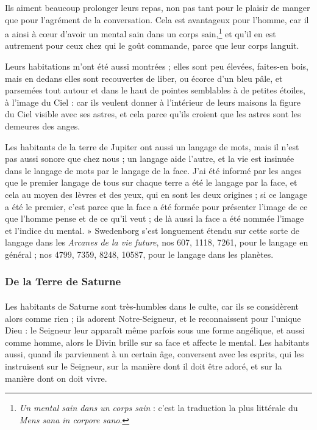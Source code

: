 \documentclass[a4paper, 11pt, oneside, landscape]{article}
\begin{document}
Ils aiment beaucoup prolonger leurs repas, non pas tant pour le plaisir de manger que pour l'agrément de la conversation. Cela est avantageux pour l'homme, car il a ainsi à cœur d'avoir un mental sain dans un corps sain,\footnote{\emph{Un mental sain dans un corps sain} : c'est la traduction la plus littérale du \emph{Mens sana in corpore sano}.} et qu'il en est autrement pour ceux chez qui le goût commande, parce que leur corps languit.

Leurs habitations m'ont été aussi montrées ; elles sont peu élevées, faites-en bois, mais en dedans elles sont recouvertes de liber, ou écorce d'un bleu pâle, et parsemées tout autour et dans le haut de pointes semblables à de petites étoiles, à l'image du Ciel : car ils veulent donner à l'intérieur de leurs maisons la figure du Ciel visible avec ses astres, et cela parce qu'ils croient que les astres sont les demeures des anges.

Les habitants de la terre de Jupiter ont aussi un langage de mots, mais il n'est pas aussi sonore que chez nous ; un langage aide l'autre, et la vie est insinuée dans le langage de mots par le langage de la face. J'ai été informé par les anges que le premier langage de tous sur chaque terre a été le langage par la face, et cela au moyen des lèvres et des yeux, qui en sont les deux origines ; si ce langage a été le premier, c'est parce que la face a été formée pour présenter l'image de ce que l'homme pense et de ce qu'il veut ; de là aussi la face a été nommée l'image et l'indice du mental. » Swedenborg s'est longuement étendu sur cette sorte de langage dans les \emph{Arcanes de la vie future}, nos 607, 1118, 7261, pour le langage en général ; nos 4799, 7359, 8248, 10587, pour le langage dans les planètes.

\subsubsection{De la Terre de Saturne}
\paragraph{}
Les habitants de Saturne sont très-humbles dans le culte, car ils se considèrent alors comme rien ; ils adorent Notre-Seigneur, et le reconnaissent pour l'unique Dieu : le Seigneur leur apparaît même parfois sous une forme angélique, et aussi comme homme, alors le Divin brille sur sa face et affecte le mental. Les habitants aussi, quand ils parviennent à un certain âge, conversent avec les esprits, qui les instruisent sur le Seigneur, sur la manière dont il doit être adoré, et sur la manière dont on doit vivre.
\end{document}
